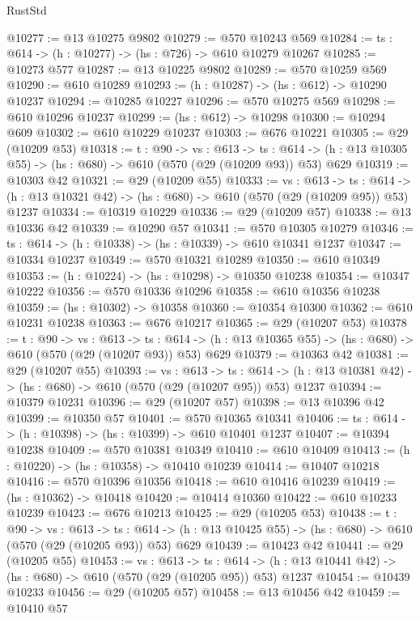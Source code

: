 \begin{lexlean}{RustStd}
\begin{coremodule}
@10277 := @13 @10275 @9802
@10279 := @570 @10243 @569
@10284 := {ts : @614} -> (h : @10277) -> (hs : @726) -> @610 @10279 @10267
@10285 := @10273 @577
@10287 := @13 @10225 @9802
@10289 := @570 @10259 @569
@10290 := @610 @10289
@10293 := (h : @10287) -> (hs : @612) -> @10290 @10237
@10294 := @10285 @10227
@10296 := @570 @10275 @569
@10298 := @610 @10296 @10237
@10299 := (hs : @612) -> @10298
@10300 := @10294 @609
@10302 := @610 @10229 @10237
@10303 := @676 @10221
@10305 := @29 (@10209 @53)
@10318 := {t : @90} ->
  {vs : @613} ->
  {ts : @614} -> (h : @13 @10305 @55) -> (hs : @680) -> @610 (@570 (@29 (@10209 @93)) @53) @629
@10319 := @10303 @42
@10321 := @29 (@10209 @55)
@10333 := {vs : @613} ->
  {ts : @614} -> (h : @13 @10321 @42) -> (hs : @680) -> @610 (@570 (@29 (@10209 @95)) @53) @1237
@10334 := @10319 @10229
@10336 := @29 (@10209 @57)
@10338 := @13 @10336 @42
@10339 := @10290 @57
@10341 := @570 @10305 @10279
@10346 := {ts : @614} -> (h : @10338) -> (hs : @10339) -> @610 @10341 @1237
@10347 := @10334 @10237
@10349 := @570 @10321 @10289
@10350 := @610 @10349
@10353 := (h : @10224) -> (hs : @10298) -> @10350 @10238
@10354 := @10347 @10222
@10356 := @570 @10336 @10296
@10358 := @610 @10356 @10238
@10359 := (hs : @10302) -> @10358
@10360 := @10354 @10300
@10362 := @610 @10231 @10238
@10363 := @676 @10217
@10365 := @29 (@10207 @53)
@10378 := {t : @90} ->
  {vs : @613} ->
  {ts : @614} -> (h : @13 @10365 @55) -> (hs : @680) -> @610 (@570 (@29 (@10207 @93)) @53) @629
@10379 := @10363 @42
@10381 := @29 (@10207 @55)
@10393 := {vs : @613} ->
  {ts : @614} -> (h : @13 @10381 @42) -> (hs : @680) -> @610 (@570 (@29 (@10207 @95)) @53) @1237
@10394 := @10379 @10231
@10396 := @29 (@10207 @57)
@10398 := @13 @10396 @42
@10399 := @10350 @57
@10401 := @570 @10365 @10341
@10406 := {ts : @614} -> (h : @10398) -> (hs : @10399) -> @610 @10401 @1237
@10407 := @10394 @10238
@10409 := @570 @10381 @10349
@10410 := @610 @10409
@10413 := (h : @10220) -> (hs : @10358) -> @10410 @10239
@10414 := @10407 @10218
@10416 := @570 @10396 @10356
@10418 := @610 @10416 @10239
@10419 := (hs : @10362) -> @10418
@10420 := @10414 @10360
@10422 := @610 @10233 @10239
@10423 := @676 @10213
@10425 := @29 (@10205 @53)
@10438 := {t : @90} ->
  {vs : @613} ->
  {ts : @614} -> (h : @13 @10425 @55) -> (hs : @680) -> @610 (@570 (@29 (@10205 @93)) @53) @629
@10439 := @10423 @42
@10441 := @29 (@10205 @55)
@10453 := {vs : @613} ->
  {ts : @614} -> (h : @13 @10441 @42) -> (hs : @680) -> @610 (@570 (@29 (@10205 @95)) @53) @1237
@10454 := @10439 @10233
@10456 := @29 (@10205 @57)
@10458 := @13 @10456 @42
@10459 := @10410 @57

\end{coremodule}
\end{lexlean}
